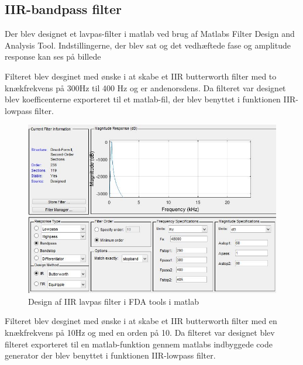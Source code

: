  
\subsection{IIR-bandpass filter}
Der blev designet et lavpas-filter i matlab ved brug af Matlabs Filter Design and Analysis Tool. Indstillingerne, der blev sat og det vedhæftede fase og amplitude response kan ses på billede 

Filteret blev desginet med ønske i at skabe et IIR butterworth filter med to knækfrekvens på 300Hz til 400 Hz og er andenorsdens. 
Da filteret var designet blev koefficenterne exporteret til et matlab-fil, der blev benyttet i funktionen IIR-lowpass filter.

\begin{figure}[H]
	\centering
	\includegraphics[width=150mm]{figures/IIRlavpas.jpg}
	\caption{Design af IIR lavpas filter i FDA tools i matlab}
	\label{fig:FDAtools}
\end{figure}

Filteret blev desginet med ønske i at skabe et IIR butterworth filter med en knækfrekvens på 10Hz og med en orden på 10. 
Da filteret var designet blev filteret exporteret til en matlab-funktion gennem matlabs indbyggede code generator der blev benyttet i funktionen IIR-lowpass filter.

